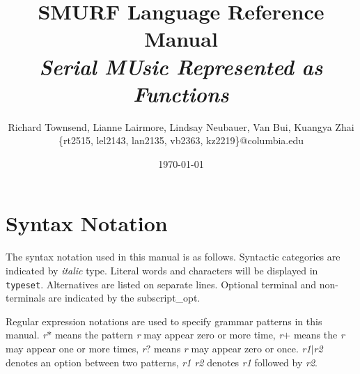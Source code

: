\documentclass[dvips, 12pt]{article}
\title{{\Huge \bfseries SMURF Language Reference Manual} \\ \Large \it Serial MUsic Represented as Functions \vspace{0.6cm}}
\author{\normalsize Richard Townsend, Lianne Lairmore, Lindsay Neubauer, Van Bui, Kuangya Zhai
	\\ \small \{rt2515, lel2143, lan2135, vb2363, kz2219\}@columbia.edu \vspace{0.6cm}}
\date{\today \vspace{2cm}}
\begin{document}
\maketitle
\clearpage


\tableofcontents

\section{Syntax Notation}
The syntax notation used in this manual is as follows. Syntactic 
categories are indicated by \emph{italic} type. Literal words and 
characters will be displayed in \texttt{typeset}. Alternatives are listed 
on separate lines. Optional terminal and non-terminals are indicated by the
subscript\_{opt}. 

Regular expression notations are used to specify grammar patterns in this
manual.  \emph{r}$*$ means the pattern \emph{r} may appear zero or more time,
\emph{r}$+$ means the \emph{r} may appear one or more times, \emph{r}$?$
means \emph{r} may appear zero or once. \emph{r1}$|$\emph{r2} denotes an option
between two patterns, \emph{r1 r2} denotes \emph{r1} followed by
\emph{r2}. 







\clearpage



\end{document}
